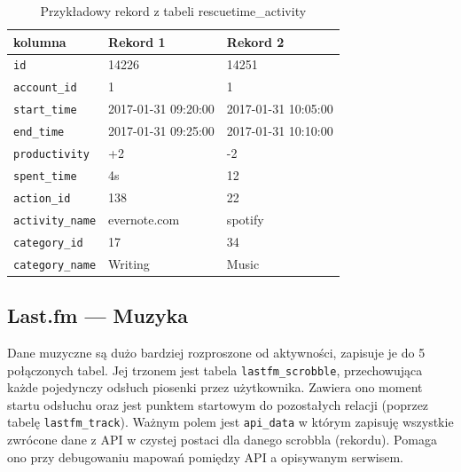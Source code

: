 \documentclass[openright]{xmgr}
\begin{document}
    \begin{table}
    \centering
    \begin{tabular}{|l|l|l|}
        \hline
        kolumna             & Rekord 1             & Rekord 2           \\ \hline
        \verb|id|           & 14226                & 14251              \\
        \verb|account_id|   & 1                    & 1                  \\ \hline
        \verb|start_time|   & 2017-01-31 09:20:00  & 2017-01-31 10:05:00\\
        \verb|end_time|     & 2017-01-31 09:25:00  & 2017-01-31 10:10:00\\ \hline
        \verb|productivity| & +2                   & -2                 \\
        \verb|spent_time|   & 4s                   & 12                 \\ \hline
        \verb|action_id|    & 138                  & 22                 \\
        \verb|activity_name|& evernote.com         & spotify            \\ \hline
        \verb|category_id|  & 17                   & 34                 \\
        \verb|category_name|& Writing              & Music              \\ \hline
    \end{tabular}
        \caption{Przykładowy rekord z tabeli rescuetime\_activity}
        \label{RescueTime --- Przykładowy rekord z tabeli rescuetime_activity}
    \end{table}

    \subsection*{Last.fm --- Muzyka}

    Dane muzyczne są dużo bardziej rozproszone od aktywności, zapisuje je do 5 połączonych tabel.
    Jej trzonem jest tabela \verb|lastfm_scrobble|, przechowująca każde pojedynczy odsłuch piosenki przez użytkownika.
    Zawiera ono moment startu odsłuchu oraz jest punktem startowym do pozostałych relacji (poprzez tabelę \verb|lastfm_track|).
    Ważnym polem jest \verb|api_data| w którym zapisuję wszystkie zwrócone dane z API w czystej postaci dla danego scrobbla (rekordu).
    Pomaga ono przy debugowaniu mapowań pomiędzy API a opisywanym serwisem.
\end{document}

